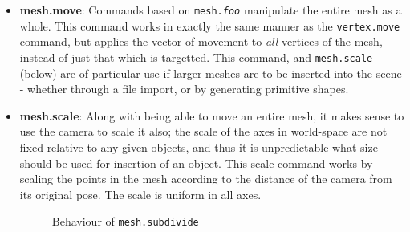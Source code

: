 \documentclass[a4paper,10pt]{article}
\begin{document}
\begin{itemize}
\item{\textbf{mesh.move}: Commands based on \texttt{mesh.\textit{foo}} manipulate the entire mesh as a whole. This command works in exactly the same manner as the \texttt{vertex.move} command, but applies the vector of movement to \textit{all} vertices of the mesh, instead of just that which is targetted. This command, and \texttt{mesh.scale} (below) are of particular use if larger meshes are to be inserted into the scene - whether through a file import, or by generating primitive shapes.}

\item{\textbf{mesh.scale}: Along with being able to move an entire mesh, it makes sense to use the camera to scale it also; the scale of the axes in world-space are not fixed relative to any given objects, and thus it is unpredictable what size should be used for insertion of an object. This scale command works by scaling the points in the mesh according to the distance of the camera from its original pose. The scale is uniform in all axes.}

\begin{figure}
  \begin{center}
  \hspace{-10px}
  \caption{Behaviour of \texttt{mesh.subdivide}}
  \label{subdiv}
  \end{center}
\end{figure}


\end{itemize}
\end{document}
